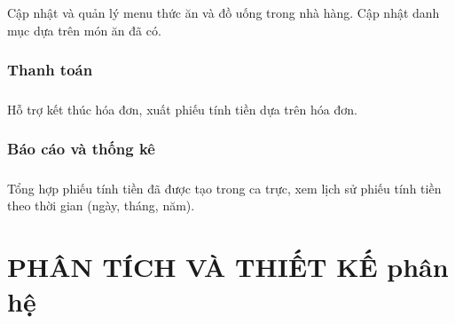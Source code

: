 \documentclass{report}
\begin{document}
\paragraph{}
Cập nhật và quản lý menu thức ăn và đồ uống trong nhà hàng. Cập nhật danh mục dựa trên món ăn đã có. 
\subsection{Thanh toán}
\paragraph{}
Hỗ trợ kết thúc hóa đơn, xuất phiếu tính tiền dựa trên hóa đơn.
\subsection{Báo cáo và thống kê}
\paragraph{}
Tổng hợp phiếu tính tiền đã được tạo trong ca trực, xem lịch sử phiếu tính tiền theo thời gian (ngày, tháng, năm).

\chapter{PHÂN TÍCH VÀ THIẾT KẾ phân hệ}
\fontsize{16}{15}\selectfont
\end{document}

